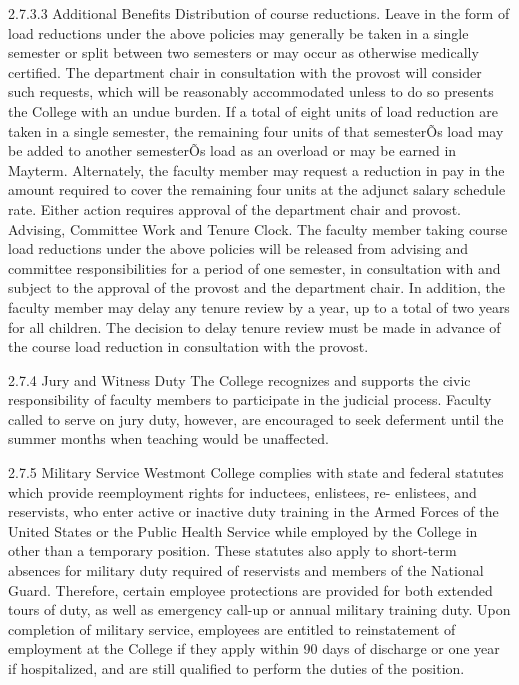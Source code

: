 \documentclass[letterpaper, 11pt]{article}
\begin{document}
	2.7.3.3 Additional Benefits
	Distribution of course reductions. Leave in the form of load reductions under the above policies may generally be taken in a single semester or split between two semesters or may occur as otherwise medically certified. The department chair in consultation with the provost will consider such requests, which will be reasonably accommodated unless to do so presents the College with an undue burden.
	If a total of eight units of load reduction are taken in a single semester, the remaining four units of that semesterÕs load may be added to another semesterÕs load as an overload or may be earned in Mayterm. Alternately, the faculty member may request a reduction in pay in the amount required to cover the remaining four units at the adjunct salary schedule rate. Either action requires approval of the department chair and provost.
	Advising, Committee Work and Tenure Clock.  The faculty member taking course load reductions under the above policies will be released from advising and committee responsibilities for a period of one semester, in consultation with and subject to the approval of the provost and the department chair. In addition, the faculty member may delay any tenure review by a year, up to a total of two years for all children.  The decision to delay tenure review must be made in advance of the course load reduction in consultation with the provost.

	2.7.4 Jury and Witness Duty
	The College recognizes and supports the civic responsibility of faculty members to participate in the judicial process.  Faculty called to serve on jury duty, however, are encouraged to seek deferment until the summer months when teaching would be unaffected.

	2.7.5 Military Service
	Westmont College complies with state and federal statutes which provide reemployment rights for inductees, enlistees, re- enlistees, and reservists, who enter active or inactive duty training in the Armed Forces of the United States or the Public Health Service while employed by the College in other than a temporary position.  These statutes also apply to short-term absences for military duty required of reservists and members of the National Guard.  Therefore, certain employee protections are provided for both extended tours of duty, as well as emergency call-up or annual military training duty.  Upon completion of military service, employees are entitled to reinstatement of employment at the College if they apply within 90 days of discharge or one year if hospitalized, and are still qualified to perform the duties of the position.
\end{document}
